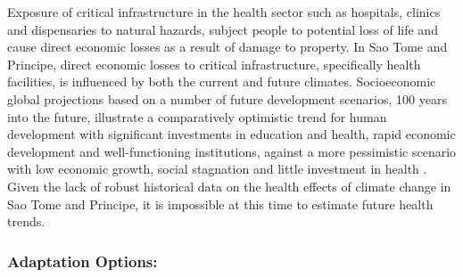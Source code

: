 \documentclass[
]{book}
\begin{document}
Exposure of critical infrastructure in the health sector such as hospitals, clinics and dispensaries to natural hazards, subject people to potential loss of life and cause direct economic losses as a result of damage to property. In Sao Tome and Principe, direct economic losses to critical infrastructure, specifically health facilities, is influenced by both the current and future climates. Socioeconomic global projections based on a number of future development scenarios, 100 years into the future, illustrate a comparatively optimistic trend for human development with significant investments in education and health, rapid economic development and well-functioning institutions, against a more pessimistic scenario with low economic growth, social stagnation and little investment in health . Given the lack of robust historical data on the health effects of climate change in Sao Tome and Principe, it is impossible at this time to estimate future health trends.

\hypertarget{adaptation-options-7}{%
\subsubsection{Adaptation Options:}\label{adaptation-options-7}}
\end{document}

